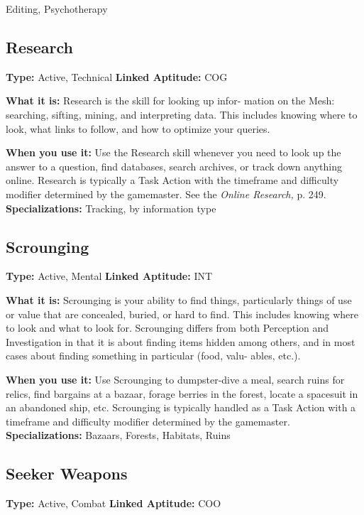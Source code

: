 Editing, Psychotherapy

\subsection{Research}

\textbf{Type:} Active, Technical
\textbf{Linked Aptitude:} COG

\textbf{What it is:} Research is the skill for looking up infor-
mation on the Mesh: searching, sifting, mining, and 
interpreting data. This includes knowing where to look, 
what links to follow, and how to optimize your queries.

\textbf{When you use it:} Use the Research skill whenever 
you need to look up the answer to a question, find 
databases, search archives, or track down anything 
online. Research is typically a Task Action with the 
timeframe and difficulty modifier determined by the 
gamemaster. See the \textit{Online Research,} p. 249.
\textbf{Specializations:} Tracking, by information type

\subsection{Scrounging}

\textbf{Type:} Active, Mental
\textbf{Linked Aptitude:} INT

\textbf{What it is:} Scrounging is your ability to find things, 
particularly things of use or value that are concealed, 
buried, or hard to find. This includes knowing where 
to look and what to look for. Scrounging differs from 
both Perception and Investigation in that it is about 
finding items hidden among others, and in most cases 
about finding something in particular (food, valu-
ables, etc.).

\textbf{When you use it:} Use Scrounging to dumpster-dive a 
meal, search ruins for relics, find bargains at a bazaar, 
forage berries in the forest, locate a spacesuit in an 
abandoned ship, etc. Scrounging is typically handled 
as a Task Action with a timeframe and difficulty 
modifier determined by the gamemaster.
\textbf{Specializations:} Bazaars, Forests, Habitats, Ruins

\subsection{Seeker Weapons}

\textbf{Type:} Active, Combat
\textbf{Linked Aptitude:} COO

